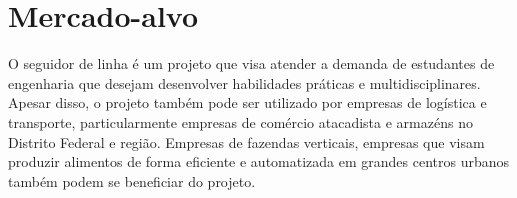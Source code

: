 \section{Mercado-alvo}

O seguidor de linha é um projeto que visa atender a demanda de estudantes de
engenharia que desejam desenvolver habilidades práticas e multidisciplinares.
Apesar disso, o projeto também pode ser utilizado por empresas de logística e
transporte, particularmente empresas de comércio atacadista e armazéns no
Distrito Federal e região. Empresas de fazendas verticais, empresas que visam
produzir alimentos de forma eficiente e automatizada em grandes centros urbanos
também podem se beneficiar do projeto.
